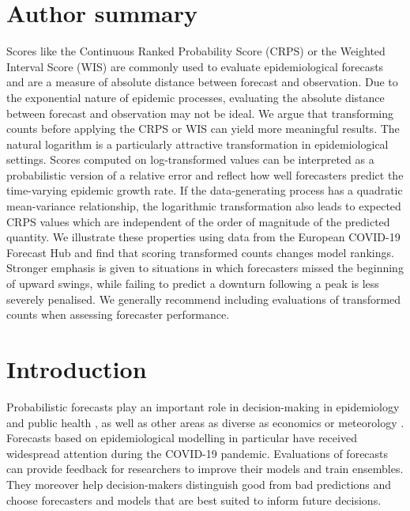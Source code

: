 \documentclass[10pt,letterpaper]{article}
\begin{document}
\section*{Author summary}
Scores like the Continuous Ranked Probability Score (CRPS) or the Weighted Interval Score (WIS) are commonly used to evaluate epidemiological forecasts and are a measure of absolute distance between forecast and observation. Due to the exponential nature of epidemic processes, evaluating the absolute distance between forecast and observation may not be ideal. We argue that transforming counts before applying the CRPS or WIS can yield more meaningful results. The natural logarithm is a particularly attractive transformation in epidemiological settings. Scores computed on log-transformed values can be interpreted as a probabilistic version of a relative error and reflect how well forecasters predict the time-varying epidemic growth rate. If the data-generating process has a quadratic mean-variance relationship, the logarithmic transformation also leads to expected CRPS values which are independent of the order of magnitude of the predicted quantity. 
We illustrate these properties using data from the European COVID-19 Forecast Hub and find that scoring transformed counts changes model rankings. Stronger emphasis is given to  situations in which forecasters missed the beginning of upward swings, while failing to predict a downturn following a peak is less severely penalised. We generally recommend including evaluations of transformed counts when assessing forecaster performance. 

\linenumbers

\section*{Introduction}

Probabilistic forecasts \cite{heldProbabilisticForecastingInfectious2017} play an important role in decision-making in epidemiology and public health \cite{doi:10.2105/AJPH.2022.306831}, as well as other areas as diverse as economics \cite{timmermannForecastingMethodsFinance2018} or meteorology \cite{gneitingWeatherForecastingEnsemble2005}. Forecasts based on epidemiological modelling in particular have received widespread attention during the COVID-19 pandemic. Evaluations of forecasts can provide feedback for researchers to improve their models and train ensembles. They moreover help decision-makers distinguish good from bad predictions and choose forecasters and models that are best suited to inform future decisions.
\end{document}

